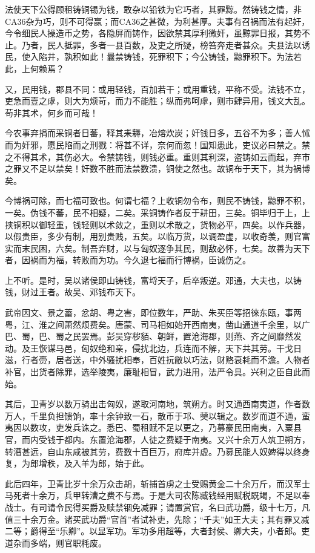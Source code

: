 \documentclass[]{article}
\begin{document}
法使天下公得顾租铸铜锡为钱，敢杂以铅铁为它巧者，其罪黥。然铸钱之情，非CA36杂为巧，则不可得赢；而CA36之甚微，为利甚厚。夫事有召祸而法有起奸，今令细民人操造币之势，各隐屏而铸作，因欲禁其厚利微奸，虽黥罪日报，其势不止。乃者，民人抵罪，多者一县百数，及吏之所疑，榜笞奔走者甚众。夫县法以诱民，使入陷井，孰积如此！曩禁铸钱，死罪积下；今公铸钱，黥罪积下。为法若此，上何赖焉？

又，民用钱，郡县不同：或用轻钱，百加若干；或用重钱，平称不受。法钱不立，吏急而壹之虖，则大为烦苛，而力不能胜；纵而弗呵虖，则市肆异用，钱文大乱。苟非其术，何乡而可哉！

今农事弃捐而采铜者日蕃，释其耒耨，冶熔炊炭；奸钱日多，五谷不为多；善人怵而为奸邪，愿民陷而之刑戮：将甚不详，奈何而忽！国知患此，吏议必曰禁之。禁之不得其术，其伤必大。令禁铸钱，则钱必重。重则其利深，盗铸如云而起，弃市之罪又不足以禁矣！奸数不胜而法禁数溃，铜使之然也。故铜布于天下，其为祸博矣。

今博祸可除，而七福可致也。何谓七福？上收铜勿令布，则民不铸钱，黥罪不积，一矣。伪钱不蕃，民不相疑，二矣。采铜铸作者反于耕田，三矣。铜毕归于上，上挟铜积以御轻重，钱轻则以术敛之，重则以术散之，货物必平，四矣。以作兵器，以假贵臣，多少有制，用别贵贱，五矣。以临万货，以调盈虚，以收奇羡，则官富实而末民困，六矣。制吾弃财，以与匈奴逐争其民，则敌必怀，七矣。故善为天下者，因祸而为福，转败而为功。今久退七福而行博祸，臣诚伤之。

上不听。是时，吴以诸侯即山铸钱，富埒天子，后卒叛逆。邓通，大夫也，以铸钱，财过王者。故吴、邓钱布天下。

武帝因文、景之蓄，忿胡、粤之害，即位数年，严助、朱买臣等招徠东瓯，事两粤，江、淮之间萧然烦费矣。唐蒙、司马相如始开西南夷，凿山通道千余里，以广巴、蜀，巴、蜀之民罢焉。彭吴穿秽貊、朝鲜，置沧海郡，则燕、齐之间靡然发动。及王恢谋马邑，匈奴绝和亲，侵扰北边，兵连而不解，天下共其劳。干戈日滋，行者赍，居者送，中外骚扰相奉，百姓抏敝以巧法，财赂衰耗而不澹。人物者补官，出货者除罪，选举陵夷，廉耻相冒，武力进用，法严令具。兴利之臣自此而始。

其后，卫青岁以数万骑出击匈奴，遂取河南地，筑朔方。时又通西南夷道，作者数万人，千里负担馈饷，率十余钟致一石，散币于邛、僰以辑之。数岁而道不通，蛮夷因以数攻，吏发兵诛之。悉巴、蜀租赋不足以更之，乃募豪民田南夷，入粟县官，而内受钱于都内。东置沧海郡，人徒之费疑于南夷。又兴十余万人筑卫朔方，转漕甚远，自山东咸被其劳，费数十百巨万，府库并虚。乃募民能人奴婢得以终身复，为郎增秩，及入羊为郎，始于此。

此后四年，卫青比岁十余万众击胡，斩捕首虏之士受赐黄金二十余万斤，而汉军士马死者十余万，兵甲转漕之费不与焉。于是大司农陈臧钱经用赋税既竭，不足以奉战士。有司请令民得买爵及赎禁锢免减罪；请置赏官，名曰武功爵，级十七万，凡值三十余万金。诸买武功爵``官首''者试补吏，先除；``千夫''如王大夫；其有罪又减二等；爵得至``乐卿''。以显军功。军功多用超等，大者封侯、卿大夫，小者郎。吏道杂而多端，则官职秏废。
\end{document}
